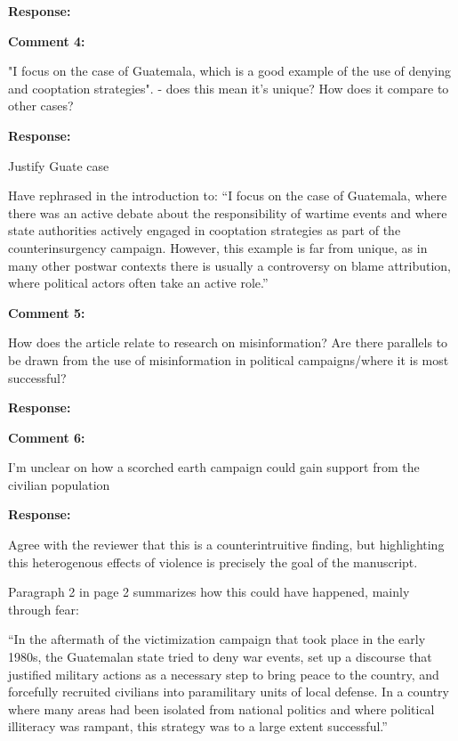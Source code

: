 \documentclass[12pt, a4paper, notitlepage]{article}
\begin{document}
\noindent\textbf{Response:}


\vspace{15pt}
\noindent\textbf{Comment 4:}
\begin{displayquote}
"I focus on the case of Guatemala, which is a good example of the use of denying and cooptation strategies". - does this mean it's unique? How does it compare to other cases?
\end{displayquote}

\noindent\textbf{Response:}

Justify Guate case

Have rephrased in the introduction to:
``I focus on the case of Guatemala, where there was an active debate about the responsibility of wartime events and where state authorities actively engaged in cooptation strategies as part of the counterinsurgency campaign.
However, this example is far from unique, as in many other postwar contexts there is usually a controversy on blame attribution, where political actors often take an active role.''

\textbf{{\color{red}{Add something in conclusion as well?}}}

\vspace{15pt}
\noindent\textbf{Comment 5:}
\begin{displayquote}
How does the article relate to research on misinformation? Are there parallels to be drawn from the use of misinformation in political campaigns/where it is most successful?
\end{displayquote}

\noindent\textbf{Response:}


\vspace{15pt}
\noindent\textbf{Comment 6:}
\begin{displayquote}
I'm unclear on how a scorched earth campaign could gain support from the civilian population
\end{displayquote}

\noindent\textbf{Response:}

Agree with the reviewer that this is a counterintruitive finding, but highlighting this heterogenous effects of violence is precisely the goal of the manuscript.

Paragraph 2 in page 2 summarizes how this could have happened, mainly through fear:

``In the aftermath of the victimization campaign that took place in the early 1980s, the Guatemalan state tried to deny war events, set up a discourse that justified military actions as a necessary step to bring peace to the country, and forcefully recruited civilians into paramilitary units of local defense.
In a country where many areas had been isolated from national politics and where political illiteracy was rampant, this strategy was to a large extent successful.''
\end{document}
